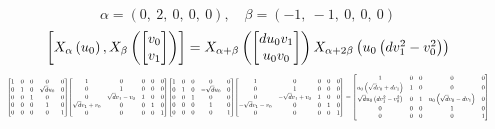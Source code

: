 \documentclass[11pt]{article}
\theoremstyle{definition}
\begin{document}
\[
\alpha = \left( 0, \  2, \  0, \  0, \  0\right), \quad \beta = \left( -1, \  -1, \  0, \  0, \  0\right)
\]
\[
\scaletoalign{\textwidth}{\left[ X_{\alpha}\left(u_{0}\right), X_{\beta}\left(\left[\begin{matrix}v_{0}\\v_{1}\end{matrix}\right]\right) \right] = X_{\alpha + \beta}\left(\left[\begin{matrix}d u_{0} v_{1}\\u_{0} v_{0}\end{matrix}\right]\right) X_{\alpha + 2\beta}\left(u_{0} \left(d v_{1}^{2} - v_{0}^{2}\right)\right)}
\]
\[
\scaletoalign{\textwidth}{{\left[\begin{matrix}1 & 0 & 0 & 0 & 0\\0 & 1 & 0 & \sqrt{d} u_{0} & 0\\0 & 0 & 1 & 0 & 0\\0 & 0 & 0 & 1 & 0\\0 & 0 & 0 & 0 & 1\end{matrix}\right]} {\left[\begin{matrix}1 & 0 & 0 & 0 & 0\\0 & 1 & 0 & 0 & 0\\0 & \sqrt{d} v_{1} - v_{0} & 1 & 0 & 0\\\sqrt{d} v_{1} + v_{0} & 0 & 0 & 1 & 0\\0 & 0 & 0 & 0 & 1\end{matrix}\right]} {\left[\begin{matrix}1 & 0 & 0 & 0 & 0\\0 & 1 & 0 & - \sqrt{d} u_{0} & 0\\0 & 0 & 1 & 0 & 0\\0 & 0 & 0 & 1 & 0\\0 & 0 & 0 & 0 & 1\end{matrix}\right]} {\left[\begin{matrix}1 & 0 & 0 & 0 & 0\\0 & 1 & 0 & 0 & 0\\0 & - \sqrt{d} v_{1} + v_{0} & 1 & 0 & 0\\- \sqrt{d} v_{1} - v_{0} & 0 & 0 & 1 & 0\\0 & 0 & 0 & 0 & 1\end{matrix}\right]} = {\left[\begin{matrix}1 & 0 & 0 & 0 & 0\\u_{0} \left(\sqrt{d} v_{0} + d v_{1}\right) & 1 & 0 & 0 & 0\\\sqrt{d} u_{0} \left(d v_{1}^{2} - v_{0}^{2}\right) & 0 & 1 & u_{0} \left(\sqrt{d} v_{0} - d v_{1}\right) & 0\\0 & 0 & 0 & 1 & 0\\0 & 0 & 0 & 0 & 1\end{matrix}\right]}}
\]
\end{document}
